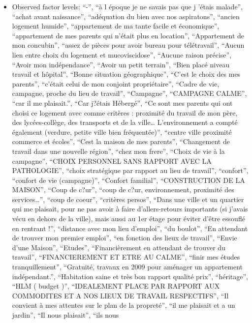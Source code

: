 \documentclass[
  letterpaper,
  DIV=11,
  numbers=noendperiod]{scrartcl}
\providecommand{\tightlist}{%
  \setlength{\itemsep}{0pt}\setlength{\parskip}{0pt}}
\begin{document}
\begin{itemize}
\tightlist
\item
  Observed factor levels: ``-'', ``à l époque je ne savais pas que j
  'étais malade'', ``achat avant naissance'', ``adéquation du bien avec
  nos aspiratons'', ``ancien logement humide'', ``appartement de ma
  tante facile et économique'', ``appartement de mes parents qui n'était
  plus en location'', ``Appartement de mon concubin'', ``assez de pièces
  pour avoir bureau pour télétravail'', ``Aucun lien entre choix du
  logement et mucoviscidose'', ``Aucune raison précise'', ``Avoir mon
  indépendance'', ``Avoir un petit terrain'', ``Bien placé niveau
  travail et hôpital'', ``Bonne situation géographique'', ``C'est le
  choix des mes parents'', ``c'était celui de mon conjoint
  propriétaire'', ``Cadre de vie, campagne, proche du lieu de travail'',
  ``Campagne'', ``CAMPAGNE CALME'', ``car il me plaisait.'', ``Car
  j?étais Hébergé'', ``Ce sont mes parents qui ont choisi ce logement
  avec comme critères : proximité du travail de mon père, des
  lycées-collège, des transports et de la ville\ldots{} L'environnement
  a compté également (verdure, petite ville bien fréquentée)'', ``centre
  ville proximité commerce et écoles'', ``Cest la maison de mes
  parents'', ``Changement de travail dans une nouvelle région'', ``chez
  mon frere'', ``Choix de vie à la campagne'', ``CHOIX PERSONNEL SANS
  RAPPORT AVEC LA PATHOLOGIE'', ``choix stratégique par rapport au lieu
  de travail'', ``confort'', ``confort de vie (campagne)'', ``Confort
  familial'', ``CONSTRUCTION DE LA MAISON'', ``Coup de c?ur'', ``coup de
  c?ur, environnement, proximité des services\ldots{}'', ``coup de
  coeur'', ``critères persos'', ``Dans une ville et un quartier qui me
  plaisait, pour ne pas avoir à faire d'allers-retours importants (si
  j'avais vécu en dehors de la ville), mais aussi au 1er étage pour
  éviter d'être essouflé en rentrant !'', ``distance avec mon lieu
  d'emploi'', ``du boulot'', ``En attendant de trouver mon premier
  emploi'', ``en fonction des lieux de travail'', ``Envie d'une
  Maison'', ``Etudes'', ``Financièrement en attendant de trouver du
  travail'', ``FINANCIEREMENT ET ETRE AU CALME'', ``finir mes études
  tranquillement'', ``Gratuité, travaux en 2009 pour aménager un
  appartement indépendant.'', ``Habitation saine et très bon rapport
  qualité prix'', ``héritage'', ``HLM ( budget )'', ``IDEALEMENT PLACE
  PAR RAPPORT AUX COMMODITES ET A NOS LIEUX DE TRAVAIL RESPECTIFS'',
  ``Il convient à mes attentes sur le plan de la propreté'', ``il me
  plaisait et a un jardin'', ``Il nous plaisait'', ``ils nous

\end{itemize}
\end{document}
